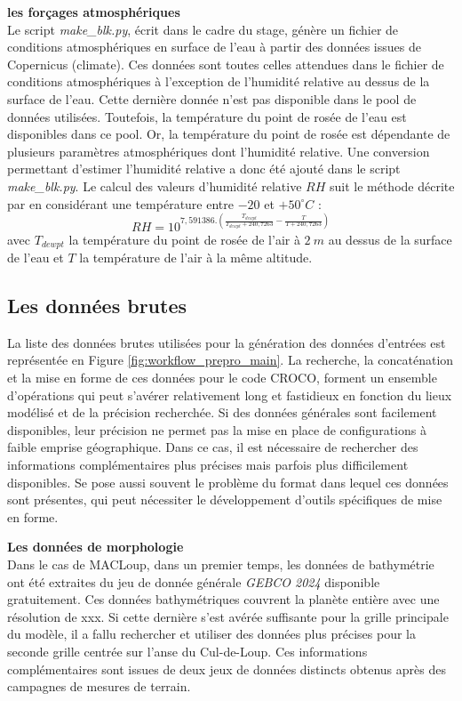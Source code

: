 \documentclass[10pt,a4paper,titlepage]{article}
\begin{document}
\textbf{les forçages atmosphériques}\\
\label{par:forcages_atm}
Le script \textit{make\_blk.py}, écrit dans le cadre du stage, génère un fichier de conditions atmosphériques en surface de l'eau à partir des données issues de Copernicus (climate).
Ces données sont toutes celles attendues dans le fichier de conditions atmosphériques à l'exception de l'humidité relative au dessus de la surface de l'eau. Cette dernière donnée n'est pas disponible dans le pool de données utilisées.
Toutefois, la température du point de rosée de l'eau est disponibles dans ce pool.
Or, la température du point de rosée est dépendante de plusieurs paramètres atmosphériques dont l'humidité relative.
Une conversion permettant d'estimer l'humidité relative a donc été ajouté dans le script \textit{make\_blk.py}.
Le calcul des valeurs d'humidité relative $RH$ suit le méthode décrite par \cite{humidity_formulation} en considérant une température entre $-20$ et $+50 ^\circ C$ :
$$RH = 10^{7,591386.(\frac{T_{dewpt}}{T_{dewpt}+240,7263}-\frac{T}{T+240,7263})}$$
avec $T_{dewpt}$ la température du point de rosée de l'air à $2~m$ au dessus de la surface de l'eau et $T$ la température de l'air à la même altitude.

\subsection{Les données brutes}

La liste des données brutes utilisées pour la génération des données d'entrées est représentée en Figure \ref{fig:workflow_prepro_main}. La recherche, la concaténation et la mise en forme de ces données pour le code CROCO, forment un ensemble d'opérations qui peut s'avérer relativement long et fastidieux en fonction du lieux modélisé et de la précision recherchée. Si des données générales sont facilement disponibles, leur précision ne permet pas la mise en place de configurations à faible emprise géographique. Dans ce cas, il est nécessaire de rechercher des informations complémentaires plus précises mais parfois plus difficilement disponibles. Se pose aussi souvent le problème du format dans lequel ces données sont présentes, qui peut nécessiter le développement d'outils spécifiques de mise en forme.

\textbf{Les données de morphologie}\\
Dans le cas de MACLoup, dans un premier temps, les données de bathymétrie ont été extraites du jeu de donnée générale \textit{GEBCO 2024} disponible gratuitement. Ces données bathymétriques couvrent la planète entière avec une résolution de \alert{xxx}. Si cette dernière s'est avérée suffisante pour la grille principale du modèle, il a fallu rechercher et utiliser des données plus précises pour la seconde grille centrée sur l'anse du Cul-de-Loup. Ces informations complémentaires sont issues de deux jeux de données distincts obtenus après des campagnes de mesures de terrain.
\end{document}
